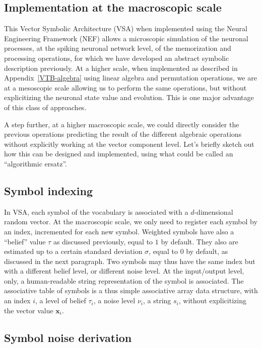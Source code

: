 \documentclass[sn-mathphys]{sn-jnl}
\begin{document}
\begin{appendices}
\section{Implementation at the macroscopic scale} \label{Algorithmic-ersatz}

This Vector Symbolic Architecture (VSA) when implemented using the Neural Engineering Framework (NEF) allows a microscopic simulation of the neuronal processes, at the spiking neuronal network level, of the memorization and processing operations, for which we have developed an abstract symbolic description previously. At a higher scale, when implemented as described in Appendix~\ref{VTB-algebra} using linear algebra and permutation operations, we are at a mesoscopic scale allowing us to perform the same operations, but without explicitizing the neuronal state value and evolution. This is one major advantage of this class of approaches.

A step further, at a higher macroscopic scale, we could directly consider the previous operations predicting the result of the different algebraic operations without explicitly working at the vector component level. Let's briefly sketch out how this can be designed and implemented, using what could be called an ``algorithmic ersatz''.

\subsection*{Symbol indexing}

In VSA, each symbol of the vocabulary is associated with a $d$-dimensional random vector. At the macroscopic scale, we only need to register each symbol by an index, incremented for each new symbol. Weighted symbols have also a ``belief'' value $\tau$ as discussed previously, equal to $1$ by default. They also are estimated up to a certain standard deviation $\sigma$, equal to $0$ by default, as discussed in the next paragraph. Two symbols may thus have the same index but with a different belief level, or different noise level. At the input/output level, only, a human-readable string representation of the symbol is associated. The associative table of symbols is a thus simple associative array data structure, with an index $i$, a level of belief $\tau_i$, a noise level $\nu_i$, a string $s_i$, without explicitizing the vector value $\mathbf{x}_i$.

\subsection*{Symbol noise derivation}


\end{appendices}
\end{document}
